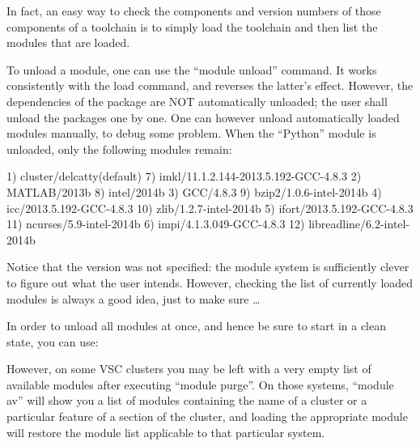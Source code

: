 In fact, an easy way to check the components and version numbers of those
components of a toolchain is to simply load the toolchain and then list the
modules that are loaded.

To unload a module, one can use the ``module unload'' command. It works
consistently with the load command, and reverses the latter's effect. However,
the dependencies of the package are NOT automatically unloaded; the user shall
unload the packages one by one. One can however unload automatically loaded
modules manually, to debug some problem. When the ``Python'' module is unloaded,
only the following modules remain:

\begin{prompt}
  1) cluster/delcatty(default)              7) imkl/11.1.2.144-2013.5.192-GCC-4.8.3
  2) MATLAB/2013b                           8) intel/2014b
  3) GCC/4.8.3                              9) bzip2/1.0.6-intel-2014b
  4) icc/2013.5.192-GCC-4.8.3              10) zlib/1.2.7-intel-2014b
  5) ifort/2013.5.192-GCC-4.8.3            11) ncurses/5.9-intel-2014b
  6) impi/4.1.3.049-GCC-4.8.3              12) libreadline/6.2-intel-2014b
\end{prompt}

Notice that the version was not specified: the module system is sufficiently
clever to figure out what the user intends. However, checking the list of
currently loaded modules is always a good idea, just to make sure \ldots

In order to unload all modules at once, and hence be sure to start in a clean
state, you can use:

\begin{prompt}
\end{prompt}

However, on some VSC clusters you may be left with a very empty list of available
modules after executing ``module purge''. On those systems, ``module av'' will show you a list of
modules containing the name of a cluster or a particular feature of a section of
the cluster, and loading the appropriate module will restore the module list
applicable to that particular system.

